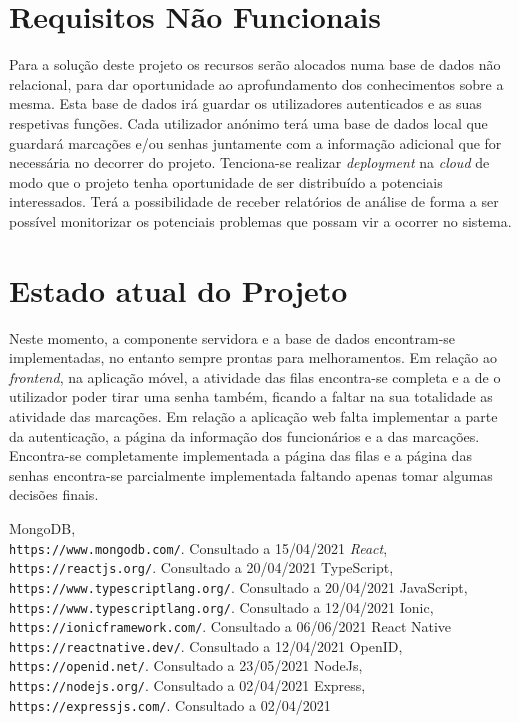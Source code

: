 \documentclass[12pt,a4paper]{article}
\begin{document}
\pagebreak
\section{Requisitos Não Funcionais}
Para a solução deste projeto os recursos serão alocados numa base de dados não relacional, para dar
oportunidade ao aprofundamento dos conhecimentos sobre a mesma. Esta base de dados irá guardar os
utilizadores autenticados e as suas respetivas funções. Cada utilizador anónimo terá uma base de dados
local que guardará marcações e/ou senhas juntamente com a informação adicional que for necessária
no decorrer do projeto.
Tenciona-se realizar \textit{deployment} na \textit{cloud} de modo que o projeto tenha oportunidade de ser
distribuído a potenciais interessados. Terá a possibilidade de receber relatórios de análise de forma a
ser possível monitorizar os potenciais problemas que possam vir a ocorrer no sistema.
\pagebreak
\section{Estado atual do Projeto}
Neste momento, a componente servidora e a base de dados encontram-se implementadas, no entanto sempre prontas para melhoramentos. 
Em relação ao \textit{frontend}, na aplicação móvel, a atividade das filas encontra-se completa e a de o utilizador poder tirar uma senha 
também, ficando a faltar na sua totalidade as atividade das marcações. Em relação a aplicação web falta implementar a parte da autenticação,
a página da informação dos funcionários e a das marcações. Encontra-se completamente implementada a página das filas e a página das senhas 
encontra-se parcialmente implementada faltando apenas tomar algumas decisões finais.

\pagebreak
\begin{thebibliography}{9}    
    MongoDB,\\\texttt{https://www.mongodb.com/}.
    Consultado a 15/04/2021
    \textit{React},\\\texttt{https://reactjs.org/}.
    Consultado a 20/04/2021    
    TypeScript,\\\texttt{https://www.typescriptlang.org/}.
    Consultado a 20/04/2021
    JavaScript,\\\texttt{https://www.typescriptlang.org/}.
    Consultado a 12/04/2021
    Ionic, \\\texttt{https://ionicframework.com/}.
    Consultado a 06/06/2021
    React Native \\\texttt{https://reactnative.dev/}.
    Consultado a 12/04/2021
    OpenID, \\\texttt{https://openid.net/}.
    Consultado a 23/05/2021
    NodeJs, \\\texttt{https://nodejs.org/}.
    Consultado a 02/04/2021
    Express, \\\texttt{https://expressjs.com/}.
    Consultado a 02/04/2021
\end{thebibliography}
\end{document}
